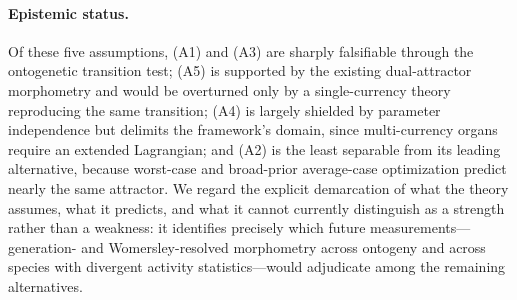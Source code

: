 \paragraph{Epistemic status.}
Of these five assumptions, (A1) and (A3) are sharply falsifiable through
the ontogenetic transition test; (A5) is supported by the existing
dual-attractor morphometry and would be overturned only by a single-currency
theory reproducing the same transition; (A4) is largely shielded by parameter
independence but delimits the framework's domain, since multi-currency organs
require an extended Lagrangian; and (A2) is the least separable from its leading
alternative, because worst-case and broad-prior average-case optimization
predict nearly the same attractor. We regard the explicit demarcation of what
the theory assumes, what it predicts, and what it cannot currently distinguish
as a strength rather than a weakness: it identifies precisely which future
measurements---generation- and Womersley-resolved morphometry across ontogeny
and across species with divergent activity statistics---would adjudicate among
the remaining alternatives.
